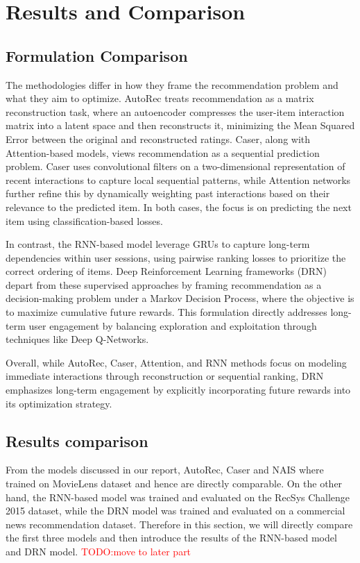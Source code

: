 \documentclass{ieeetj}
\begin{document}
\section{Results and Comparison}
\subsection{Formulation Comparison}
The methodologies differ in how they frame the recommendation problem and what they aim to optimize. AutoRec treats recommendation as a matrix reconstruction task, where an autoencoder compresses the user-item interaction matrix into a latent space and then reconstructs it, minimizing the Mean Squared Error between the original and reconstructed ratings. Caser, along with Attention-based models, views recommendation as a sequential prediction problem. Caser uses convolutional filters on a two-dimensional representation of recent interactions to capture local sequential patterns, while Attention networks further refine this by dynamically weighting past interactions based on their relevance to the predicted item. In both cases, the focus is on predicting the next item using classification-based losses.

In contrast, the RNN-based model leverage GRUs to capture long-term dependencies within user sessions, using pairwise ranking losses to prioritize the correct ordering of items. Deep Reinforcement Learning frameworks (DRN) depart from these supervised approaches by framing recommendation as a decision-making problem under a Markov Decision Process, where the objective is to maximize cumulative future rewards. This formulation directly addresses long-term user engagement by balancing exploration and exploitation through techniques like Deep Q-Networks.

Overall, while AutoRec, Caser, Attention, and RNN methods focus on modeling immediate interactions through reconstruction or sequential ranking, DRN emphasizes long-term engagement by explicitly incorporating future rewards into its optimization strategy.

\subsection{Results comparison}

From the models discussed in our report, AutoRec, Caser and NAIS where trained on MovieLens dataset and hence are directly comparable. On the other hand, the RNN-based model was trained and evaluated on the RecSys Challenge 2015 dataset, while the DRN model was trained and evaluated on a commercial news recommendation dataset. Therefore in this section, we will directly compare the first three models and then introduce the results of the RNN-based model and DRN model.
\textcolor{red}{TODO:move to later part}
\end{document}
